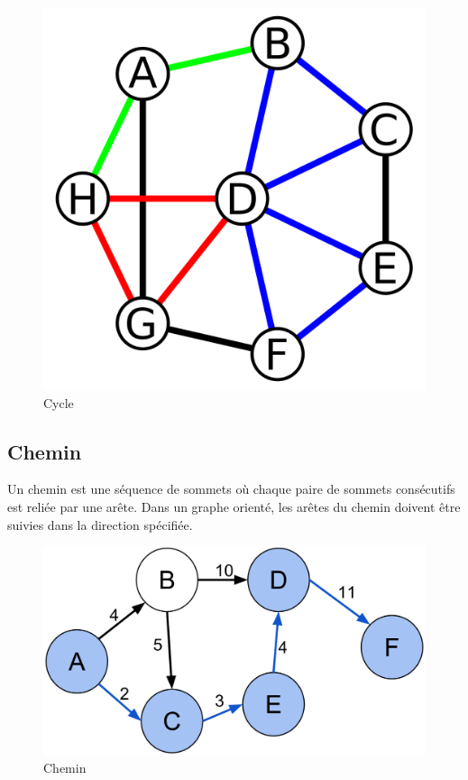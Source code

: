 \begin{figure}[H]
    \centering
    \includegraphics[width=0.5 \textwidth]{Assets/cycle.png}
    \caption{Cycle}
    \label{fig: Cycle}
\end{figure}



\subsection{Chemin}
Un chemin est une séquence de sommets où chaque paire de sommets consécutifs est reliée par une arête. Dans un graphe orienté, les arêtes du chemin doivent être suivies dans la direction spécifiée.

\begin{figure}[H]
    \centering
    \includegraphics[width=0.5 \textwidth]{Assets/chemin.png}
    \caption{Chemin}
    \label{fig: Chemin}
\end{figure}